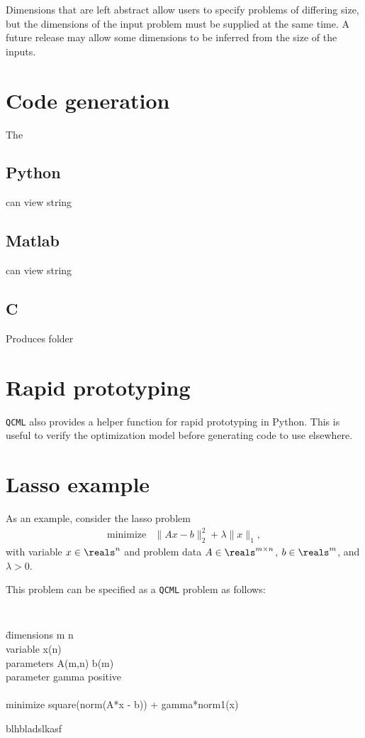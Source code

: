 \documentclass[11pt]{article}
\def\qcml{\texttt{QCML}\xspace}
\begin{document}
Dimensions that are left abstract allow users to specify problems of
differing size, but the dimensions of the input problem must be supplied at
the same time. A future release may allow some dimensions to be inferred from
the size of the inputs.

\section{Code generation}
The 
\subsection{Python}
can view string
\subsection{Matlab}
can view string
\subsection{C}
Produces folder

\section{Rapid prototyping}
\qcml also provides a helper function for rapid prototyping in Python. This
is useful to verify the optimization model before generating code to use
elsewhere.

\section{Lasso example}
As an example, consider the lasso problem
\[
\begin{array}{ll}
  \mbox{minimize} & \|Ax - b\|_2^2 + \lambda \|x\|_1,
\end{array}
\]
with variable $x \in \reals^n$ and problem data $A\in\reals^{m\times n}$, 
$b \in \reals^m$, and $\lambda > 0$.

This problem can be specified as a \qcml problem as follows:
{\tt
\begin{tabbing}
\qquad 
\= dimensions m n \\
\> variable x(n) \\
\> parameters A(m,n) b(m)\\ 
\> parameter gamma positive\\
\\
\> minimize square(norm(A*x - b)) + gamma*norm1(x)
\end{tabbing}
}
\noindent blhbladslkasf
\end{document}
